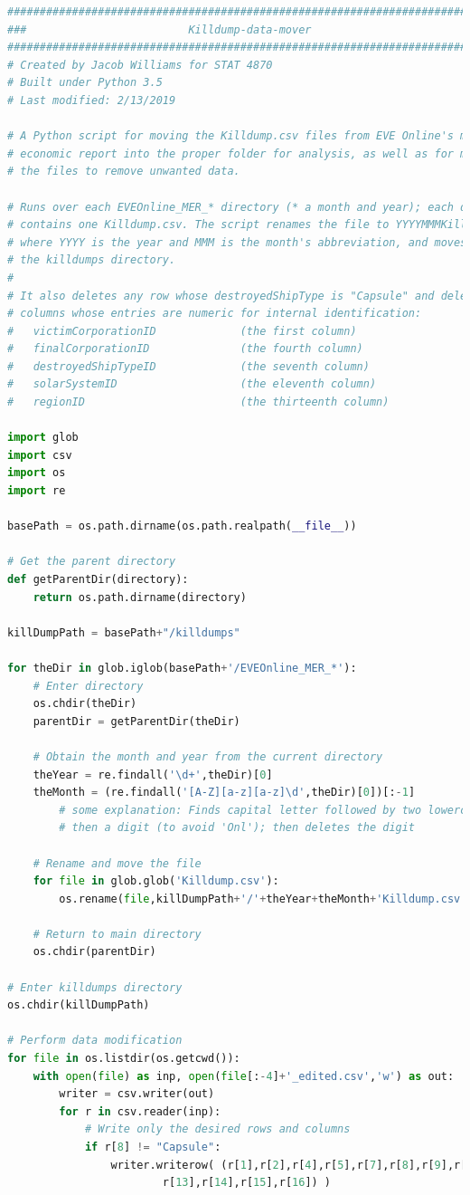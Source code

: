 \documentclass[letterpaper,12pt,article]{memoir}
\begin{document}
{\tiny
\begin{lstlisting}[language=Python]
###############################################################################
###                         Killdump-data-mover                             ###
###############################################################################
# Created by Jacob Williams for STAT 4870
# Built under Python 3.5
# Last modified: 2/13/2019

# A Python script for moving the Killdump.csv files from EVE Online's monthly
# economic report into the proper folder for analysis, as well as for modifying
# the files to remove unwanted data.

# Runs over each EVEOnline_MER_* directory (* a month and year); each directory
# contains one Killdump.csv. The script renames the file to YYYYMMMKilldump.csv
# where YYYY is the year and MMM is the month's abbreviation, and moves it to
# the killdumps directory.
# 
# It also deletes any row whose destroyedShipType is "Capsule" and deletes the
# columns whose entries are numeric for internal identification:
#   victimCorporationID             (the first column)
#   finalCorporationID              (the fourth column)
#   destroyedShipTypeID             (the seventh column)
#   solarSystemID                   (the eleventh column)
#   regionID                        (the thirteenth column)

import glob
import csv
import os
import re

basePath = os.path.dirname(os.path.realpath(__file__))

# Get the parent directory
def getParentDir(directory):
    return os.path.dirname(directory)

killDumpPath = basePath+"/killdumps"

for theDir in glob.iglob(basePath+'/EVEOnline_MER_*'):
    # Enter directory 
    os.chdir(theDir)
    parentDir = getParentDir(theDir)

    # Obtain the month and year from the current directory
    theYear = re.findall('\d+',theDir)[0]
    theMonth = (re.findall('[A-Z][a-z][a-z]\d',theDir)[0])[:-1]
        # some explanation: Finds capital letter followed by two lowercase
        # then a digit (to avoid 'Onl'); then deletes the digit
    
    # Rename and move the file
    for file in glob.glob('Killdump.csv'):
        os.rename(file,killDumpPath+'/'+theYear+theMonth+'Killdump.csv')

    # Return to main directory
    os.chdir(parentDir)

# Enter killdumps directory
os.chdir(killDumpPath)

# Perform data modification
for file in os.listdir(os.getcwd()):
    with open(file) as inp, open(file[:-4]+'_edited.csv','w') as out:
        writer = csv.writer(out)
        for r in csv.reader(inp):
            # Write only the desired rows and columns
            if r[8] != "Capsule":
                writer.writerow( (r[1],r[2],r[4],r[5],r[7],r[8],r[9],r[11],
                        r[13],r[14],r[15],r[16]) )

\end{lstlisting}
}
\end{document}
